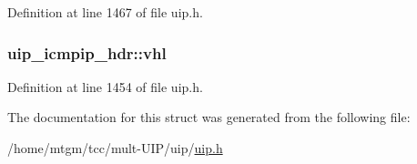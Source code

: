 Definition at line 1467 of file uip.h.

\hypertarget{structuip__icmpip__hdr_a7d472d8b3c41618d39c93c4ca92fb3f4}{
\subsubsection[{vhl}]{ {\bf uip\_\-icmpip\_\-hdr::vhl}}}
\label{structuip__icmpip__hdr_a7d472d8b3c41618d39c93c4ca92fb3f4}


Definition at line 1454 of file uip.h.



The documentation for this struct was generated from the following file:\begin{DoxyCompactItemize}
\item 
/home/mtgm/tcc/mult-\/UIP/uip/\hyperlink{uip_8h}{uip.h}\end{DoxyCompactItemize}
